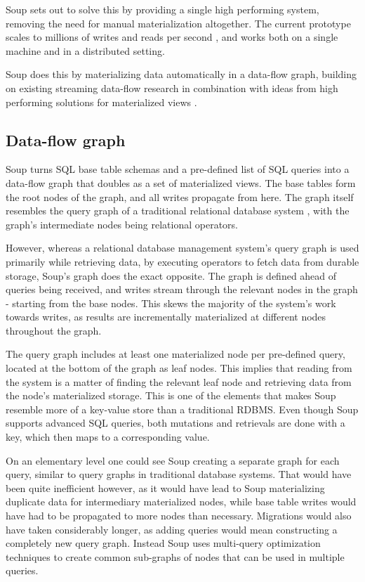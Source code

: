 \documentclass[b5paper]{report}
\begin{document}
Soup sets out to solve this by providing a single high performing system,
removing the need for manual materialization altogether. The current prototype
scales to millions of writes and reads per second \cite{soup}, and works both on
a single machine and in a distributed setting.

Soup does this by materializing data automatically in a data-flow graph,
building on existing streaming data-flow research \cite{naiad, dataflow} in
combination with ideas from high performing solutions for materialized views
\cite{dbtoaster, pequod}.

\subsection{Data-flow graph}
Soup turns SQL base table schemas and a pre-defined list of SQL queries into a
data-flow graph that doubles as a set of materialized views. The base tables
form the root nodes of the graph, and all writes propagate from here. The graph
itself resembles the query graph of a traditional relational database system
\cite{codd}, with the graph's intermediate nodes being relational operators.

However, whereas a relational database management system's query graph is used
primarily while retrieving data, by executing operators to fetch data from
durable storage, Soup's graph does the exact opposite. The graph is defined
ahead of queries being received, and writes stream through the relevant nodes in
the graph - starting from the base nodes. This skews the majority of the
system's work towards writes, as results are incrementally materialized at
different nodes throughout the graph.

The query graph includes at least one materialized node per pre-defined query,
located at the bottom of the graph as leaf nodes. This implies that reading from
the system is a matter of finding the relevant leaf node and retrieving data
from the node's materialized storage. This is one of the elements that makes Soup
resemble more of a key-value store than a traditional RDBMS. Even though Soup
supports advanced SQL queries, both mutations and retrievals are done with a
key, which then maps to a corresponding value.

On an elementary level one could see Soup creating a separate graph for each
query, similar to query graphs in traditional database systems. That would have
been quite inefficient however, as it would have lead to Soup materializing
duplicate data for intermediary materialized nodes, while base table writes
would have had to be propagated to more nodes than necessary. Migrations would
also have taken considerably longer, as adding queries would mean constructing a
completely new query graph. Instead Soup uses multi-query optimization
techniques to create common sub-graphs of nodes that can be used in multiple
queries.
\end{document}
